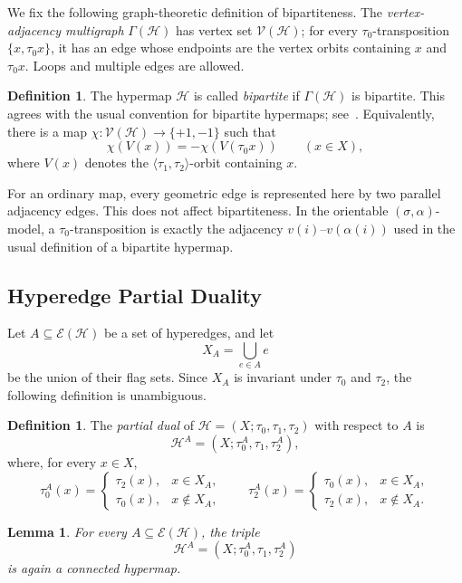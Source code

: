\documentclass[10pt,a4paper]{article}
\newtheorem{lemma}[theorem]{Lemma}
\theoremstyle{definition}
\newtheorem{definition}[theorem]{Definition}
\theoremstyle{remark}
\newcommand{\Hcal}{\mathcal{H}}
\newcommand{\Ecal}{\mathcal{E}}
\newcommand{\Vcal}{\mathcal{V}}
\begin{document}
We fix the following graph-theoretic definition of bipartiteness. The \emph{vertex-adjacency multigraph} $\Gamma(\Hcal)$ has vertex set $\Vcal(\Hcal)$; for every $\tau_0$-transposition $\{x,\tau_0x\}$, it has an edge whose endpoints are the vertex orbits containing $x$ and $\tau_0x$. Loops and multiple edges are allowed.

\begin{definition}\label{def:bipartite}
The hypermap $\Hcal$ is called \emph{bipartite} if $\Gamma(\Hcal)$ is bipartite. This agrees with the usual convention for bipartite hypermaps; see~\cite{Walsh1975,BredaDuarte2007}. Equivalently, there is a map $\chi:\Vcal(\Hcal)\to\{+1,-1\}$ such that
\[
  \chi(V(x))=-\chi(V(\tau_0x))\qquad(x\in X),
\]
where $V(x)$ denotes the $\langle\tau_1,\tau_2\rangle$-orbit containing $x$.
\end{definition}

For an ordinary map, every geometric edge is represented here by two parallel adjacency edges. This does not affect bipartiteness. In the orientable $(\sigma,\alpha)$-model, a $\tau_0$-transposition is exactly the adjacency $v(i)$--$v(\alpha(i))$ used in the usual definition of a bipartite hypermap.

\subsection{Hyperedge Partial Duality}

Let $A\subseteq\Ecal(\Hcal)$ be a set of hyperedges, and let
\[
  X_A=\bigcup_{e\in A}e
\]
be the union of their flag sets. Since $X_A$ is invariant under $\tau_0$ and $\tau_2$, the following definition is unambiguous.

\begin{definition}\label{def:partial-dual}
The \emph{partial dual} of $\Hcal=(X;\tau_0,\tau_1,\tau_2)$ with respect to $A$ is
\[
  \Hcal^A=(X;\tau_0^A,\tau_1,\tau_2^A),
\]
where, for every $x\in X$,
\[
 \tau_0^A(x)=
 \begin{cases}
   \tau_2(x),&x\in X_A,\\
   \tau_0(x),&x\notin X_A,
 \end{cases}
 \qquad
 \tau_2^A(x)=
 \begin{cases}
   \tau_0(x),&x\in X_A,\\
   \tau_2(x),&x\notin X_A.
 \end{cases}
\]
\end{definition}

\begin{lemma}\label{lem:partial-dual-hypermap}
For every $A\subseteq\Ecal(\Hcal)$, the triple
\[
  \Hcal^A=(X;\tau_0^A,\tau_1,\tau_2^A)
\]
is again a connected hypermap.
\end{lemma}
\end{document}
